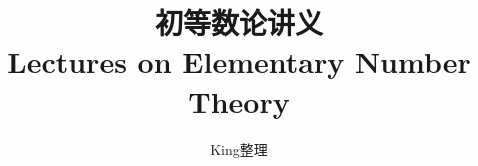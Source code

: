 \title{\heiti\vspace*{-2cm} 初等数论讲义\\{\vspace*{-1.2cm}Lectures on Elementary Number Theory}}
\author{King\hspace{1em}整理}
\date{}
\maketitle

